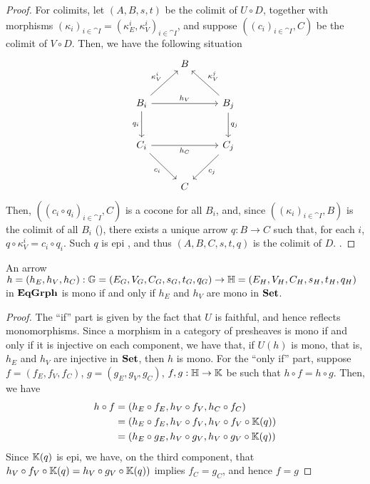 \begin{proof}
     For colimits, let $(A, B, s, t)$ be the colimit of $U \circ D$, together with morphisms $(\kappa_i)_{i \in \cat I} = (\kappa_E^i, \kappa_V^i)_{i \in \cat I}$, and suppose $((c_i)_{i \in \cat I}, C)$ be the colimit of $V \circ D$. Then, we have the following situation
     \[
	     \begin{tikzcd}[row sep = 25, column sep=25]
			& B & \\
			B_i \ar[rr, "{h_V}"] \ar[ur, "{\kappa_V^i}"] \ar[d, "{q_i}"swap] & & B_j \ar[ul, "{\kappa_V^j}"swap] \ar[d, "q_j"] \\
			C_i \ar[rr, "{h_C}" swap] \ar[dr, "{c_i}"swap] & & C_j \ar[dl, "{c_j}"] \\
			& C &
		\end{tikzcd}
     \]
     Then, $((c_i \circ q_i)_{i \in \cat I}, C)$ is a cocone for all $B_i$, and, since $((\kappa_i)_{i \in \cat I}, B)$ is the colimit of all $B_i$ (), there exists a unique arrow $q: B \to C$ such that, for each $i$, $q \circ \kappa_V^i = c_i \circ q_i$. Such $q$ is epi {\color{red}{dimostrare}}, and thus $(A, B, C, s, t, q)$ is the colimit of $D$. {\color{red}{rifinire, dimostrare unicità}}.

\end{proof}

\begin{cor}\label{cor:mono_in_EqGrph}
    An arrow $h = (h_E, h_V, h_C): \mathbb{G} = (E_G, V_G, C_G, s_G, t_G, q_G) \to \mathbb{H} = (E_H, V_H, C_H, s_H, t_H, q_H)$ in $\mathbf{EqGrph}$ is mono if and only if $h_E$ and $h_V$ are mono in $\mathbf{Set}$.
\end{cor}

\begin{proof}
    The ``if'' part is given by the fact that $U$ is faithful, and hence reflects monomorphisms. Since a morphism in a category of presheaves is mono if and only if it is injective on each component, we have that, if  $U(h)$ is mono, that is, $h_E$ and $h_V$ are injective in $\mathbf{Set}$, then $h$ is mono.
    For the ``only if'' part, suppose $f = (f_E, f_V, f_C)$, $g=(g_E, g_V, g_C)$, $f, g : \mathbb{H \to K}$ be such that $h \circ f = h \circ g$. Then, we have
    \begin{align*}
        h \circ f   &= (h_E \circ f_E, h_V \circ f_V, h_C \circ f_C) \\
                    &= (h_E \circ f_E, h_V \circ f_V, h_V \circ f_V \circ \mathbb{K}(q)) \\
                    &= (h_E \circ g_E, h_V \circ g_V, h_V \circ g_V \circ \mathbb{K}(q))
    \end{align*}    
    Since $\mathbb{K}(q)$ is epi, we have, on the third component, that $h_V \circ f_V \circ \mathbb{K}(q) = h_V \circ g_V \circ \mathbb{K}(q))$ implies $f_C = g_C$, and hence $f = g$    
\end{proof}

